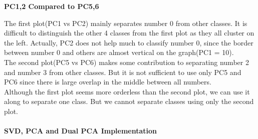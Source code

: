 \documentclass[12pt]{article}
\begin{document}
\textbf{PC1,2 Compared to PC5,6}
\begin{figure}[H]
\captionsetup[subfigure]{labelformat=empty}
\centering
{}
\end{figure}
\vspace*{-1.5cm}
\noindent
The first plot(PC1 vs PC2) mainly separates number 0 from other classes. It is difficult to distinguish the other 4 classes from the first plot as they all cluster on the left. Actually, PC2 does not help much to classify number 0, since the border between number 0 and others are almost vertical on the graph(PC1 = 10).\\
The second plot(PC5 vs PC6) makes some contribution to separating number 2 and number 3 from other classes. But it is not sufficient to use only PC5 and PC6 since there is large overlap in the middle between all numbers.\\
Although the first plot seems more orderless than the second plot, we can use it along to separate one class. But we cannot separate classes using only the second plot.\\\\
\textbf{SVD, PCA and Dual PCA Implementation}
\end{document}
